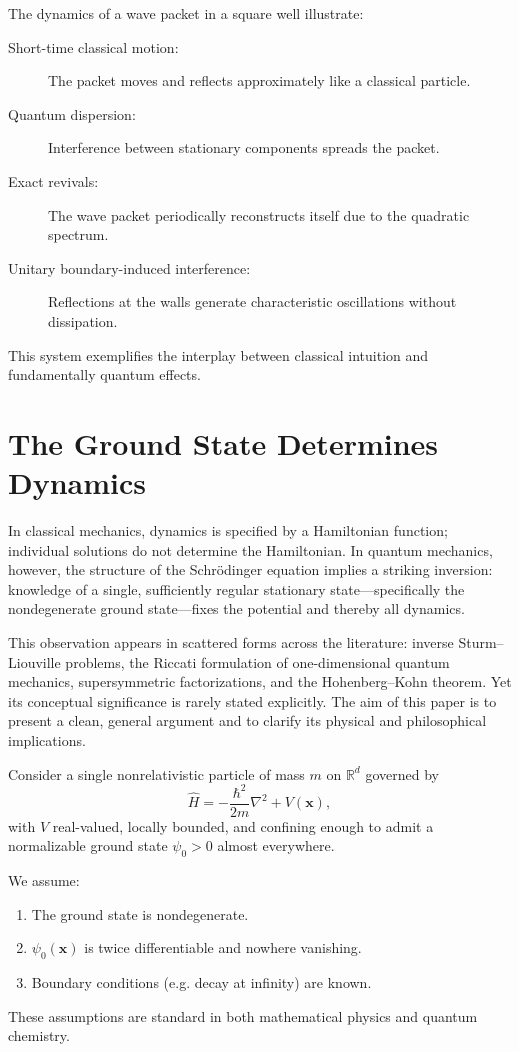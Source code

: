 The dynamics of a wave packet in a square well illustrate:
\begin{description}
    \item [Short-time classical motion:] The packet moves and reflects approximately like a classical particle.
    \item [Quantum dispersion:] Interference between stationary components spreads the packet.
    \item [Exact revivals:] The wave packet periodically reconstructs itself due to the quadratic spectrum.
    \item [Unitary boundary-induced interference:] Reflections at the walls generate characteristic oscillations without dissipation.
\end{description}
This system exemplifies the interplay between classical intuition and fundamentally quantum effects.

\section{The Ground State Determines  Dynamics }
\label{gsd}

In classical mechanics, dynamics is specified by a Hamiltonian function; individual solutions do not determine the Hamiltonian. In quantum mechanics, however, the structure of the Schr\"odinger equation implies a striking inversion: knowledge of a single, sufficiently regular stationary state---specifically the nondegenerate ground state---fixes the potential and thereby all dynamics.

This observation appears in scattered forms across the literature: inverse Sturm--Liouville problems, the Riccati formulation of one-dimensional quantum mechanics, supersymmetric factorizations, and the Hohenberg--Kohn theorem. Yet its conceptual significance is rarely stated explicitly. The aim of this paper is to present a clean, general argument and to clarify its physical and philosophical implications.

Consider a single nonrelativistic particle of mass $m$ on $\mathbb{R}^d$ governed by
\begin{equation}
\hat H = -\frac{\hbar^2}{2m}\nabla^2 + V(\mathbf{x}),
\end{equation}
with $V$ real-valued, locally bounded, and confining enough to admit a normalizable ground state $\psi_0>0$ almost everywhere.

We assume:
\begin{enumerate}
\item The ground state is nondegenerate.
\item $\psi_0(\mathbf{x})$ is twice differentiable and nowhere vanishing.
\item Boundary conditions (e.g. decay at infinity) are known.
\end{enumerate}
These assumptions are standard in both mathematical physics and quantum chemistry.


